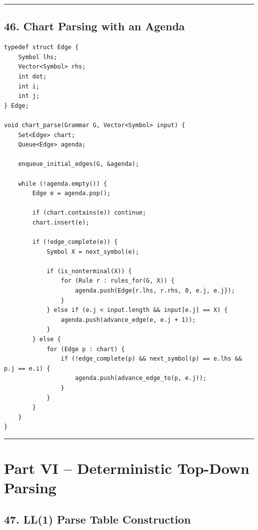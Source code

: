 \documentclass[10pt,letterpaper]{article}
\begin{document}
\medskip\hrule\medskip

\subsection*{46. Chart Parsing with an Agenda}

\begin{verbatim}
typedef struct Edge {
    Symbol lhs;
    Vector<Symbol> rhs;
    int dot;
    int i;
    int j;
} Edge;

void chart_parse(Grammar G, Vector<Symbol> input) {
    Set<Edge> chart;
    Queue<Edge> agenda;

    enqueue_initial_edges(G, &agenda);

    while (!agenda.empty()) {
        Edge e = agenda.pop();

        if (chart.contains(e)) continue;
        chart.insert(e);

        if (!edge_complete(e)) {
            Symbol X = next_symbol(e);

            if (is_nonterminal(X)) {
                for (Rule r : rules_for(G, X)) {
                    agenda.push(Edge{r.lhs, r.rhs, 0, e.j, e.j});
                }
            } else if (e.j < input.length && input[e.j] == X) {
                agenda.push(advance_edge(e, e.j + 1));
            }
        } else {
            for (Edge p : chart) {
                if (!edge_complete(p) && next_symbol(p) == e.lhs && p.j == e.i) {
                    agenda.push(advance_edge_to(p, e.j));
                }
            }
        }
    }
}
\end{verbatim}

\medskip\hrule\medskip

\clearpage
\section*{Part VI -- Deterministic Top-Down Parsing}

\subsection*{47. LL(1) Parse Table Construction}
\end{document}
